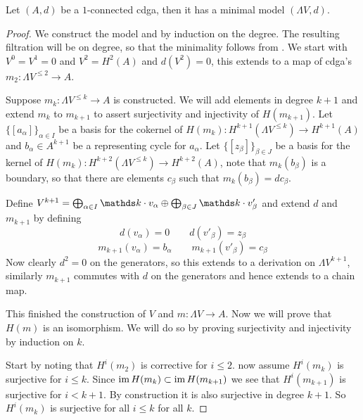 \begin{theorem}
	Let $(A, d)$ be a $1$-connected cdga, then it has a minimal model $(\Lambda V, d)$.
\end{theorem}
\begin{proof}
	We construct the model and by induction on the degree. The resulting filtration will be on degree, so that the minimality follows from . We start with $V^0 = V^1 = 0$ and $V^2 = H^2(A)$ and $d(V^2) = 0$, this extends to a map of cdga's $m_2 : \Lambda V^{\leq 2} \to A$.

	Suppose $m_k : \Lambda V^{\leq k} \to A$ is constructed. We will add elements in degree $k+1$ and extend $m_k$ to $m_{k+1}$ to assert surjectivity and injectivity of $H(m_{k+1})$. Let $\{ [a_\alpha] \}_{\alpha \in I}$ be a basis for the cokernel of $H(m_k) : H^{k+1}(\Lambda V^{\leq k}) \to H^{k+1}(A)$ and $b_\alpha \in A^{k+1}$ be a representing cycle for $a_\alpha$. Let $\{ [z_\beta] \}_{\beta \in J}$ be a basis for the kernel of $H(m_k) : H^{k+2}(\Lambda V^{\leq k}) \to H^{k+2}(A)$, note that $m_k(b_\beta)$ is a boundary, so that there are elements $c_\beta$ such that $m_k(b_\beta) = d c_\beta$.

	Define $V^{k+1} = \bigoplus_{\alpha \in I} \k \cdot v_\alpha \oplus \bigoplus_{\beta \in J} \k \cdot v'_\beta$ and extend $d$ and $m_{k+1}$ by defining
	\[ d(v_\alpha) = 0 \qquad d(v'_\beta) = z_\beta \]
	\[ m_{k+1}(v_\alpha) = b_\alpha \qquad m_{k+1}(v'_\beta) = c_\beta \]
	Now clearly $d^2=0$ on the generators, so this extends to a derivation on $\Lambda V^{k+1}$, similarly $m_{k+1}$ commutes with $d$ on the generators and hence extends to a chain map.

	This finished the construction of $V$ and $m : \Lambda V \to A$. Now we will prove that $H(m)$ is an isomorphism. We will do so by proving surjectivity and injectivity by induction on $k$.

	Start by noting that $H^i(m_2)$ is corrective for $i \leq 2$. now assume $H^i(m_k)$ is surjective for $i \leq k$. Since $\operatorname*{im} H(m_k) \subset \operatorname*{im} H(m_{k+1})$ we see that $H^i(m_{k+1})$ is surjective for $i < k+1$. By construction it is also surjective in degree $k+1$. So $H^i(m_k)$ is surjective for all $i \leq k$ for all $k$.


\end{proof}
